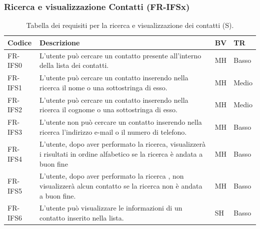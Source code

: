 \documentclass[a4paper,12pt]{article}
\begin{document}
    \subsubsection{Ricerca e visualizzazione Contatti (FR-IFSx)}
    \begin{table}[H]
        \centering
        \begin{tabular}{|l|p{8cm}|l|l|}
            \hline
            \textbf{Codice} & \textbf{Descrizione} & \textbf{BV} & \textbf{TR} \\
            \hline
            FR-IFS0 & L'utente può cercare un contatto presente all'interno della lista dei contatti. & MH & Basso \\
            \hline
            FR-IFS1 & L'utente può cercare un contatto inserendo nella ricerca il nome o una sottostringa di esso. & MH & Medio \\
            \hline
            FR-IFS2 & L'utente può cercare un contatto inserendo nella ricerca il cognome o una sottostringa di esso. & MH & Medio \\
            \hline
            FR-IFS3 & L'utente non può cercare un contatto inserendo nella ricerca l'indirizzo e-mail o il numero di telefono. & MH & Basso \\
            \hline
            FR-IFS4 & L'utente, dopo aver performato la ricerca, visualizzerà i risultati in ordine alfabetico se la ricerca è andata a buon fine & MH & Basso \\
            \hline
            FR-IFS5 & L'utente, dopo aver performato la ricerca , non visualizzerà alcun contatto se la ricerca non è andata a buon fine. & MH & Basso \\
            \hline
            FR-IFS6 & L'utente può visualizzare le informazioni di un contatto inserito nella lista. & SH & Basso \\ \hline
        \end{tabular}
        \caption{Tabella dei requisiti per la ricerca e visualizzazione dei contatti (S).}
    \end{table}
\end{document}
